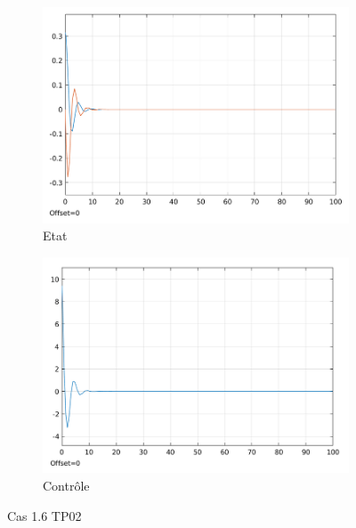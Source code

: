 \documentclass[a4paper]{article}
\begin{document}
                        \begin{figure}[h!]
                                \centering
                                \begin{subfigure}[b]{0.45\textwidth}
                                        \includegraphics[width=\textwidth]{images/courbe_cas_1_6_TP02.png}
                                        \caption{Etat}
                                        \label{fig_cas_1.6_TP02_etats}
                                \end{subfigure}
                                \hspace{30pt}
                                \begin{subfigure}[b]{0.45\textwidth}
                                        \includegraphics[width=\textwidth]{images/controle_cas_1_6_TP02.png}
                                        \caption{Contrôle}
                                        \label{fig_cas_1.6_TP02_controle}
                                \end{subfigure}
                                \caption{Cas 1.6 TP02}
                                \label{fig_cas_1.6_TP02}
                        \end{figure}
\end{document}

